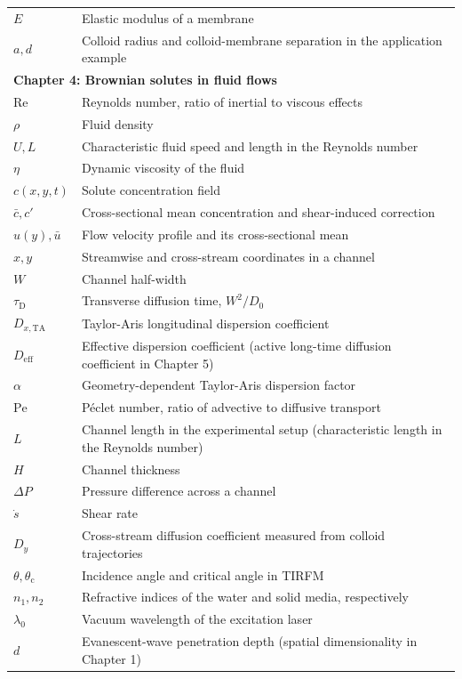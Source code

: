 \begin{longtable}{p{3cm}p{11cm}}
$E$ & Elastic modulus of a membrane \\
$a,d$ & Colloid radius and colloid-membrane separation in the application example \\
\hline
\multicolumn{2}{l}{\textbf{Chapter 4: Brownian solutes in fluid flows}}\\
$\mathrm{Re}$ & Reynolds number, ratio of inertial to viscous effects \\
$\rho$ & Fluid density \\
$U,L$ & Characteristic fluid speed and length in the Reynolds number \\
$\eta$ & Dynamic viscosity of the fluid \\
$c(x,y,t)$ & Solute concentration field \\
$\bar c,c'$ & Cross-sectional mean concentration and shear-induced correction \\
$u(y),\bar u$ & Flow velocity profile and its cross-sectional mean \\
$x,y$ & Streamwise and cross-stream coordinates in a channel \\
$W$ & Channel half-width \\
$\tau_\mathrm{D}$ & Transverse diffusion time, $W^2/D_0$ \\
$D_{x,\mathrm{TA}}$ & Taylor-Aris longitudinal dispersion coefficient \\
$D_\mathrm{eff}$ & Effective dispersion coefficient (active long-time diffusion coefficient in Chapter 5) \\
$\alpha$ & Geometry-dependent Taylor-Aris dispersion factor \\
$\mathrm{Pe}$ & Péclet number, ratio of advective to diffusive transport \\
$L$ & Channel length in the experimental setup (characteristic length in the Reynolds number) \\
$H$ & Channel thickness \\
$\Delta P$ & Pressure difference across a channel \\
$\dot s$ & Shear rate \\
$D_y$ & Cross-stream diffusion coefficient measured from colloid trajectories \\
$\theta,\theta_\mathrm{c}$ & Incidence angle and critical angle in TIRFM \\
$n_1,n_2$ & Refractive indices of the water and solid media, respectively \\
$\lambda_0$ & Vacuum wavelength of the excitation laser \\
$d$ & Evanescent-wave penetration depth (spatial dimensionality in Chapter 1) \\

\end{longtable}
